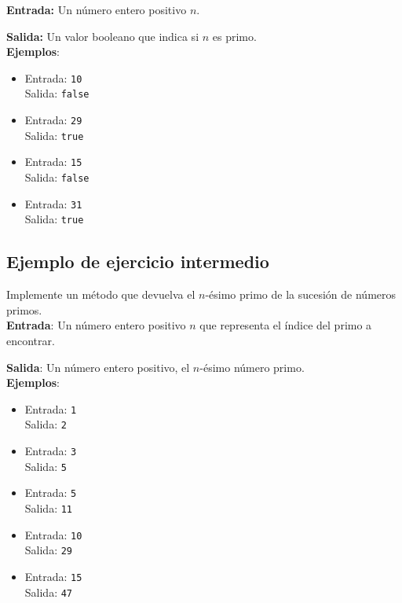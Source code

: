 \documentclass{article}
\begin{document}
\textbf{Entrada:} Un número entero positivo \( n \). 

\textbf{Salida:} Un valor booleano que indica si \( n \) es primo.\\

\textbf{Ejemplos}:
\begin{itemize}
    \item Entrada: \texttt{10}\\
          Salida: \texttt{false}
    \item Entrada: \texttt{29}\\
          Salida: \texttt{true}
    \item Entrada: \texttt{15}\\
          Salida: \texttt{false}
    \item Entrada: \texttt{31}\\
          Salida: \texttt{true}
\end{itemize}

\subsection*{Ejemplo de ejercicio intermedio}

Implemente un método que devuelva el $n$-ésimo primo de la sucesión de números primos.\\

\textbf{Entrada}: Un número entero positivo \(n\) que representa el índice del primo a encontrar.

\textbf{Salida}: Un número entero positivo, el \(n\)-ésimo número primo.\\

\textbf{Ejemplos}:
\begin{itemize} 
    \item Entrada: \texttt{1}\\ 
    Salida: \texttt{2}
    \item Entrada: \texttt{3}\\
    Salida: \texttt{5}

    \item Entrada: \texttt{5}\\
          Salida: \texttt{11}
    
    \item Entrada: \texttt{10}\\
          Salida: \texttt{29}
    
    \item Entrada: \texttt{15}\\
          Salida: \texttt{47}
\end{itemize}
\end{document}
